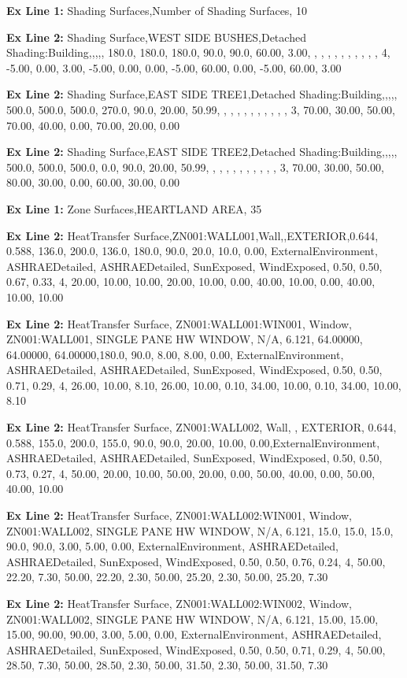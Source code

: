 \textbf{Ex Line 1:} Shading Surfaces,Number of Shading Surfaces, 10

\textbf{Ex Line 2:} Shading Surface,WEST SIDE BUSHES,Detached Shading:Building,,,,, 180.0, 180.0, 180.0, 90.0, 90.0, 60.00, 3.00, , , , , , , , , , , 4, -5.00, 0.00, 3.00, -5.00, 0.00, 0.00, -5.00, 60.00, 0.00, -5.00, 60.00, 3.00

\textbf{Ex Line 2:} Shading Surface,EAST SIDE TREE1,Detached Shading:Building,,,,, 500.0, 500.0, 500.0, 270.0, 90.0, 20.00, 50.99, , , , , , , , , , , 3, 70.00, 30.00, 50.00, 70.00, 40.00, 0.00, 70.00, 20.00, 0.00

\textbf{Ex Line 2:} Shading Surface,EAST SIDE TREE2,Detached Shading:Building,,,,, 500.0, 500.0, 500.0, 0.0, 90.0, 20.00, 50.99, , , , , , , , , , , 3, 70.00, 30.00, 50.00, 80.00, 30.00, 0.00, 60.00, 30.00, 0.00

\textbf{Ex Line 1:} Zone Surfaces,HEARTLAND AREA, 35

\textbf{Ex Line 2:} HeatTransfer Surface,ZN001:WALL001,Wall,,EXTERIOR,0.644, 0.588, 136.0, 200.0, 136.0, 180.0, 90.0, 20.0, 10.0, 0.00, ExternalEnvironment, ASHRAEDetailed, ASHRAEDetailed, SunExposed, WindExposed, 0.50, 0.50, 0.67, 0.33, 4, 20.00, 10.00, 10.00, 20.00, 10.00, 0.00, 40.00, 10.00, 0.00, 40.00, 10.00, 10.00

\textbf{Ex Line 2:} HeatTransfer Surface, ZN001:WALL001:WIN001, Window, ZN001:WALL001, SINGLE PANE HW WINDOW, N/A, 6.121, 64.00000, 64.00000, 64.00000,180.0, 90.0, 8.00, 8.00, 0.00, ExternalEnvironment, ASHRAEDetailed, ASHRAEDetailed, SunExposed, WindExposed, 0.50, 0.50, 0.71, 0.29, 4, 26.00, 10.00, 8.10, 26.00, 10.00, 0.10, 34.00, 10.00, 0.10, 34.00, 10.00, 8.10

\textbf{Ex Line 2:} HeatTransfer Surface, ZN001:WALL002, Wall, , EXTERIOR, 0.644, 0.588, 155.0, 200.0, 155.0, 90.0, 90.0, 20.00, 10.00, 0.00,ExternalEnvironment, ASHRAEDetailed, ASHRAEDetailed, SunExposed, WindExposed, 0.50, 0.50, 0.73, 0.27, 4, 50.00, 20.00, 10.00, 50.00, 20.00, 0.00, 50.00, 40.00, 0.00, 50.00, 40.00, 10.00

\textbf{Ex Line 2:} HeatTransfer Surface, ZN001:WALL002:WIN001, Window, ZN001:WALL002, SINGLE PANE HW WINDOW, N/A, 6.121, 15.0, 15.0, 15.0, 90.0, 90.0, 3.00, 5.00, 0.00, ExternalEnvironment, ASHRAEDetailed, ASHRAEDetailed, SunExposed, WindExposed, 0.50, 0.50, 0.76, 0.24, 4, 50.00, 22.20, 7.30, 50.00, 22.20, 2.30, 50.00, 25.20, 2.30, 50.00, 25.20, 7.30

\textbf{Ex Line 2:} HeatTransfer Surface, ZN001:WALL002:WIN002, Window, ZN001:WALL002, SINGLE PANE HW WINDOW, N/A, 6.121, 15.00, 15.00, 15.00, 90.00, 90.00, 3.00, 5.00, 0.00, ExternalEnvironment, ASHRAEDetailed, ASHRAEDetailed, SunExposed, WindExposed, 0.50, 0.50, 0.71, 0.29, 4, 50.00, 28.50, 7.30, 50.00, 28.50, 2.30, 50.00, 31.50, 2.30, 50.00, 31.50, 7.30

